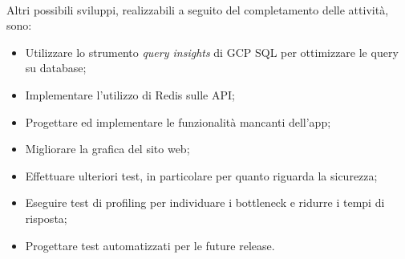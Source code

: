 \documentclass[11pt,a4paper,english]{article}
\begin{document}
\paragraph{} Altri possibili sviluppi, realizzabili a seguito del completamento delle attività, sono:
\begin{itemize}
    \item Utilizzare lo strumento \emph{query insights} di GCP SQL per ottimizzare le query su database;
    \item Implementare l'utilizzo di Redis sulle API;
    \item Progettare ed implementare le funzionalità mancanti dell'app;
    \item Migliorare la grafica del sito web;
    \item Effettuare ulteriori test, in particolare per quanto riguarda la sicurezza;
    \item Eseguire test di profiling per individuare i bottleneck e ridurre i tempi di risposta;
    \item Progettare test automatizzati per le future release.
\end{itemize} 
\end{document}
